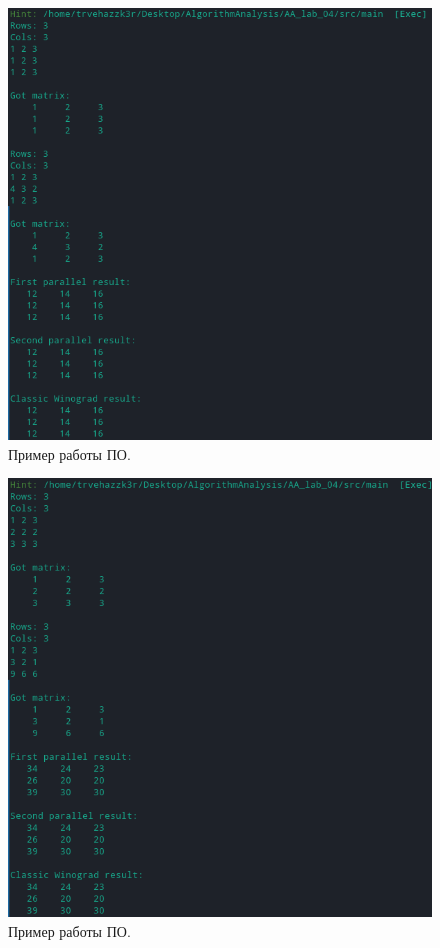 \documentclass[12pt]{report}
\begin{document}
\begin{figure}
\begin{center}
\includegraphics[]{inc/img/example1.png}
\captionsetup{justification=centering}
	\caption{Пример работы ПО.}
	\label{img:example1}	
\end{center}
\end{figure}

\begin{figure}
\begin{center}
\includegraphics[]{inc/img/example2.png}
\captionsetup{justification=centering}
	\caption{Пример работы ПО.}
	\label{img:example2}	
\end{center}
\end{figure}
\end{document}
